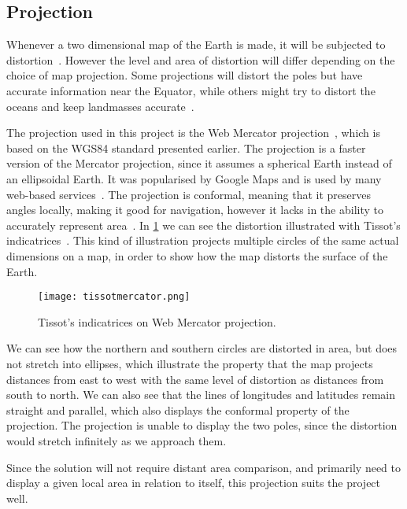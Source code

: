 \subsection{Projection}
Whenever a two dimensional map of the Earth is made, it will be subjected to distortion~\cite{projectionalbum}. However the level and area of distortion will differ depending on the choice of map projection. Some projections will distort the poles but have accurate information near the Equator, while others might try to distort the oceans and keep landmasses accurate~\cite{website:Wikipedia-mapprojections}.

The projection used in this project is the Web Mercator projection~\cite{webmercator}, which is based on the WGS84 standard presented earlier. The projection is a faster version of the Mercator projection, since it assumes a spherical Earth instead of an ellipsoidal Earth. It was popularised by Google Maps and is used by many web-based services~\cite{webmercator}. The projection is conformal, meaning that it preserves angles locally, making it good for navigation, however it lacks in the ability to accurately represent area~\cite{mercatorcritique}. In \cref{tissots} we can see the distortion illustrated with Tissot's indicatrices~\cite{tissot}. This kind of illustration projects multiple circles of the same actual dimensions on a map, in order to show how the map distorts the surface of the Earth.

\begin{figure}[htbp]
    \centering
\texttt{[image: tissotmercator.png]}
\caption{Tissot's indicatrices on Web Mercator projection.}
\label{tissots}
\end{figure}

We can see how the northern and southern circles are distorted in area, but does not stretch into ellipses, which illustrate the property that the map projects distances from east to west with the same level of distortion as distances from south to north. We can also see that the lines of longitudes and latitudes remain straight and parallel, which also displays the conformal property of the projection. The projection is unable to display the two poles, since the distortion would stretch infinitely as we approach them.

Since the solution will not require distant area comparison, and primarily need to display a given local area in relation to itself, this projection suits the project well.

